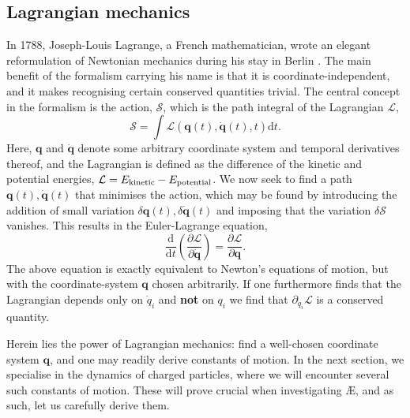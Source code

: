 \subsection{Lagrangian mechanics}
In 1788, Joseph-Louis Lagrange, a French mathematician, wrote an elegant reformulation of Newtonian mechanics during his stay in Berlin \cite{lagrange1853mecanique}. The main benefit of the formalism carrying his name is that it is coordinate-independent, and it makes recognising certain conserved quantities trivial. The central concept in the formalism is the action, $\mathcal{S}$, which is the path integral of the Lagrangian $\mathcal{L}$,
\begin{equation}
    \mathcal{S} = \int \mathcal{L}(\boldsymbol{q}(t),\dot{\boldsymbol{q}}(t),t) \mathrm{d} t.
\end{equation}
Here, $\boldsymbol{q}$ and $\dot{\boldsymbol{q}}$ denote some arbitrary coordinate system and temporal derivatives thereof, and the Lagrangian is defined as the difference of the kinetic and potential energies, $\mathcal{L} = E_{\rm kinetic} - E_{\rm potential}$. We now seek to find a path $\boldsymbol{q}(t),\dot{\boldsymbol{q}}(t)$ that minimises the action, which may be found by introducing the addition of small variation $ \delta \boldsymbol{q}(t),\delta \dot{\boldsymbol{q}}(t)$ and imposing that the variation $\delta \mathcal{S}$ vanishes. This results in the Euler-Lagrange equation,
\begin{equation}
    \frac{\mathrm{d}}{\mathrm{d} t} \left( \frac{\partial \mathcal{L}}{\partial \dot{\boldsymbol{q}}} \right) = \frac{\partial \mathcal{L}}{ \partial \boldsymbol{q} }.
    \label{eq: EL equation}
\end{equation}
The above equation is exactly equivalent to Newton's equations of motion, but with the coordinate-system $\boldsymbol{q}$ chosen arbitrarily. If one furthermore finds that the Lagrangian depends only on $\dot{q}_i$ and \textbf{not} on $q_i$ we find that $\partial_{\dot{q}_{i}} \mathcal{L}$ is a conserved quantity. \par 
Herein lies the power of Lagrangian mechanics: find a well-chosen coordinate system $\boldsymbol{q}$, and one may readily derive constants of motion. In the next section, we specialise in the dynamics of charged particles, where we will encounter several such constants of motion. These will prove crucial when investigating \AE{}, and as such, let us carefully derive them.
